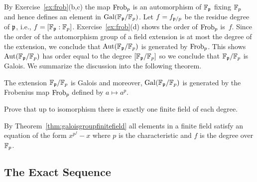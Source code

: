 By Exercise~\ref{ex:frob}(b,c) the map $\operatorname{Frob}_p$ is an
automorphism of $\mathbb{F}_{\mathfrak{p}}$ fixing $\mathbb{F}_p$ and hence defines
an element in $\operatorname{Gal}(\mathbb{F}_{\mathfrak{p}}/\mathbb{F}_p)$. Let $f = f_{\mathfrak{p}/p}$ be the residue
degree of $\mathfrak{p}$, i.e., $f = [\mathbb{F}_{\mathfrak{p}}:\mathbb{F}_p]$.
Exercise~\ref{ex:frob}(d) shows the order of $\operatorname{Frob}_p$ is~$f$.
Since the order of the automorphism group of a field extension
is at most the degree of the extension, we conclude that
$\operatorname{Aut}(\mathbb{F}_{\mathfrak{p}}/\mathbb{F}_p)$ is generated by $\operatorname{Frob}_p$. This shows
$\operatorname{Aut}(\mathbb{F}_{\mathfrak{p}}/\mathbb{F}_p)$ has order equal to the degree $[\mathbb{F}_{\mathfrak{p}}/\mathbb{F}_p]$
so we conclude that $\mathbb{F}_{\mathfrak{p}}/\mathbb{F}_p$ is Galois.
We summarize the discussion into the following theorem.

\begin{theorem}\label{thm:galoisgroupfinitefield}
	The extension $\mathbb{F}_{\mathfrak{p}}/\mathbb{F}_p$ is Galois and moreover,
	$\operatorname{Gal}(\mathbb{F}_{\mathfrak{p}}/\mathbb{F}_p)$ is generated by the Frobenius map
	$\operatorname{Frob}_p$ defined by $a\mapsto a^p$.
\end{theorem}

\begin{exercise}
	Prove that up to isomorphism there is
	exactly one finite field of each degree.

	\begin{hint}
		By Theorem~\ref{thm:galoisgroupfinitefield}
		all elements in a finite field satisfy an equation
		of the form $x^{p^f} - x$ where $p$ is the
		characteristic and $f$ is the degree over $\mathbb{F}_p$.
	\end{hint}
\end{exercise}


\subsection{The Exact Sequence}\label{sec:exactseq}

